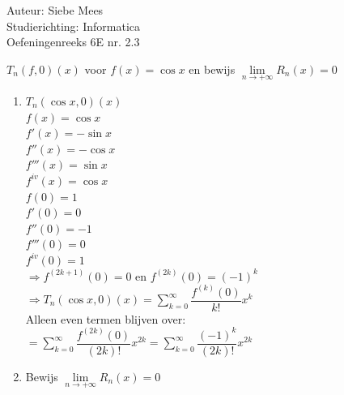 \documentclass[a4paper]{article}
\begin{document}
  
\noindent \large Auteur: Siebe Mees \\
\noindent \large Studierichting: Informatica\\
\noindent \large Oefeningenreeks 6E nr. 2.3\\

\medskip

\normalsize

$T_n\left(f,0\right)(x)$ voor $f(x)=\cos x$ en bewijs $\lim\limits_{n\rightarrow +\infty}R_n(x)=0$\\

\begin{enumerate}

\item $T_n\left(\cos x,0\right)(x)$\\

$f(x)=\cos x$\\

$f'(x)=-\sin x$\\

$f''(x)=-\cos x$\\

$f'''(x)=\sin x$\\

$f^{iv}(x)=\cos x$\\

$f(0)=1$\\

$f'(0)=0$\\

$f''(0)=-1$\\

$f'''(0)=0$\\

$f^{iv}(0)=1$\\

$\Rightarrow f^{(2k+1)}(0)=0 $ en $ f^{(2k)}(0)=(-1)^k$\\

$\Rightarrow T_n\left(\cos x,0\right)(x)=\displaystyle\sum_{k=0}^{\infty}\dfrac{f^{(k)}(0)}{k!}x^k$\\

Alleen even termen blijven over:\\

$=\displaystyle\sum_{k=0}^{\infty}\dfrac{f^{(2k)}(0)}{(2k)!}x^{2k}=\displaystyle\sum_{k=0}^{\infty}\dfrac{(-1)^k}{(2k)!}x^{2k}$\\

\item Bewijs $\lim\limits_{n\rightarrow +\infty}R_n(x)=0$\\


\end{enumerate}
\end{document}
